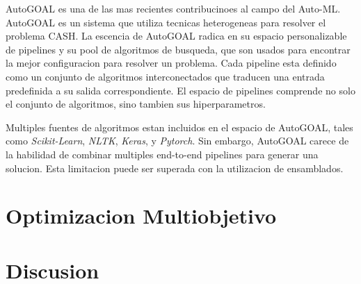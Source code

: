 AutoGOAL \cite{autogoal, estevez2020general} es una de las mas recientes contribucinoes al campo del Auto-ML. AutoGOAL es un sistema que utiliza tecnicas heterogeneas para resolver el problema CASH. La escencia de AutoGOAL radica en su espacio personalizable de pipelines y su pool de algoritmos de busqueda, que son usados para encontrar la mejor configuracion para resolver un problema. Cada pipeline esta definido como un conjunto de algoritmos interconectados que traducen una entrada predefinida a su salida correspondiente. El espacio de pipelines comprende no solo el conjunto de algoritmos, sino tambien sus hiperparametros.

Multiples fuentes de algoritmos estan incluidos en el espacio de AutoGOAL, tales como \textit{Scikit-Learn}\cite{pedregosa2011scikit}, \textit{NLTK}\cite{nltk}, \textit{Keras}\cite{chollet2015keras}, y \textit{Pytorch}\cite{paszke2019pytorch}. Sin embargo, AutoGOAL carece de la habilidad de combinar multiples end-to-end pipelines para generar una solucion. Esta limitacion puede ser superada con la utilizacion de ensamblados.

\section{Optimizacion Multiobjetivo}\label{section:multiobjective}

\section{Discusion}\label{discussion}
